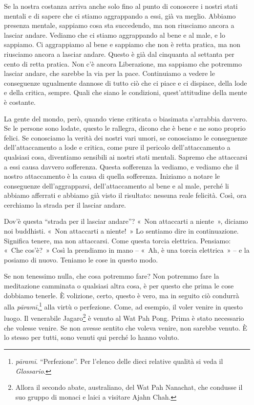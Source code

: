 Se la nostra costanza arriva anche solo fino al punto di conoscere i
nostri stati mentali e di sapere che ci stiamo aggrappando a essi, già
va meglio. Abbiamo presenza mentale, sappiamo cosa sta succedendo, ma
non riusciamo ancora a lasciar andare. Vediamo che ci stiamo aggrappando
al bene e al male, e lo sappiamo. Ci aggrappiamo al bene e sappiamo che
non è retta pratica, ma non riusciamo ancora a lasciar andare. Questo è
già dal cinquanta al settanta per cento di retta pratica. Non c'è ancora
Liberazione, ma sappiamo che potremmo lasciar andare, che sarebbe la via
per la pace. Continuiamo a vedere le conseguenze ugualmente dannose di
tutto ciò che ci piace e ci dispiace, della lode e della critica,
sempre. Quali che siano le condizioni, quest'attitudine della mente è
costante.

La gente del mondo, però, quando viene criticata o biasimata s'arrabbia
davvero. Se le persone sono lodate, questo le rallegra, dicono che è
bene e ne sono proprio felici. Se conosciamo la verità dei nostri vari
umori, se conosciamo le conseguenze dell'attaccamento a lode e critica,
come pure il pericolo dell'attaccamento a qualsiasi cosa, diventiamo
sensibili ai nostri stati mentali. Sapremo che attaccarsi a essi causa
davvero sofferenza. Questa sofferenza la vediamo, e vediamo che il
nostro attaccamento è la causa di quella sofferenza. Iniziamo a notare
le conseguenze dell'aggrapparsi, dell'attaccamento al bene e al male,
perché li abbiamo afferrati e abbiamo già visto il risultato: nessuna
reale felicità. Così, ora cerchiamo la strada per il lasciar andare.

Dov'è questa ``strada per il lasciar andare''? «~Non attaccarti a
niente~», diciamo noi buddhisti. «~Non attaccarti a niente!~» Lo
sentiamo dire in continuazione. Significa tenere, ma non attaccarsi.
Come questa torcia elettrica. Pensiamo: «~Che cos'è?~» Così la prendiamo
in mano -- «~Ah, è una torcia elettrica~» -- e la posiamo di nuovo.
Teniamo le cose in questo modo.

Se non tenessimo nulla, che cosa potremmo fare? Non potremmo fare la
meditazione camminata o qualsiasi altra cosa, è per questo che prima le
cose dobbiamo tenerle. È volizione, certo, questo è vero, ma in seguito
ciò condurrà alla \emph{pāramī},\footnote{\emph{pāramī}. ``Perfezione''.
  Per l'elenco delle dieci relative qualità si veda il \emph{Glossario}.}
alla virtù o perfezione. Come, ad esempio, il voler venire in questo
luogo. Il venerabile Jagaro\footnote{Allora il secondo abate,
  australiano, del Wat Pah Nanachat, che condusse il suo gruppo di
  monaci e laici a visitare Ajahn Chah.} è venuto al Wat Pah Pong. Prima
è stato necessario che volesse venire. Se non avesse sentito che voleva
venire, non sarebbe venuto. È lo stesso per tutti, sono venuti qui
perché lo hanno voluto.

